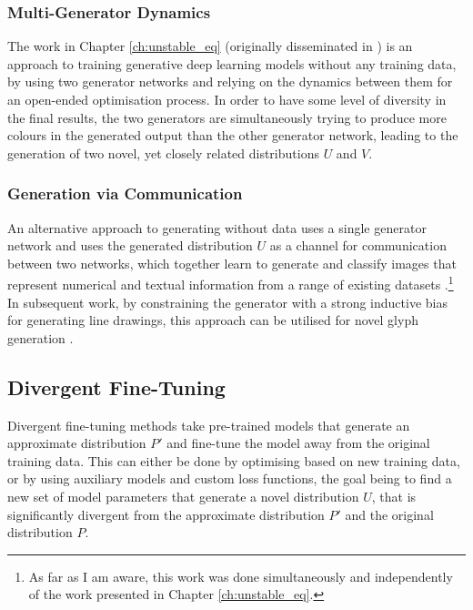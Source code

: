 \subsubsection{Multi-Generator Dynamics}

The work in Chapter \ref{ch:unstable_eq} (originally disseminated in \citep{broad2019searching}) is an approach to training generative deep learning models without any training data, by using two generator networks and relying on the dynamics between them for an open-ended optimisation process. 
In order to have some level of diversity in the final results, the two generators are simultaneously trying to produce more colours in the generated output than the other generator network, leading to the generation of two novel, yet closely related distributions $U$ and $V$.

\subsubsection{Generation via Communication} 

An alternative approach to generating without data uses a single generator network and uses the generated distribution $U$ as a channel for communication between two networks, which together learn to generate and classify images that represent numerical and textual information from a range of existing datasets \citep{simon2019dimensions}.\footnote{As far as I am aware, this work was done simultaneously and independently of the work presented in Chapter \ref{ch:unstable_eq}.} 
In subsequent work, by constraining the generator with a strong inductive bias for generating line drawings, this approach can be utilised for novel glyph generation \citep{park2020generating}.


\subsection{Divergent Fine-Tuning}
\label{survey:divergent}

Divergent fine-tuning methods take pre-trained models that generate an approximate distribution $P'$ and fine-tune the model away from the original training data. 
This can either be done by optimising based on new training data, or by using auxiliary models and custom loss functions, the goal being to find a new set of model parameters that generate a novel distribution $U$, that is significantly divergent from the approximate distribution $P'$ and the original distribution $P$.

